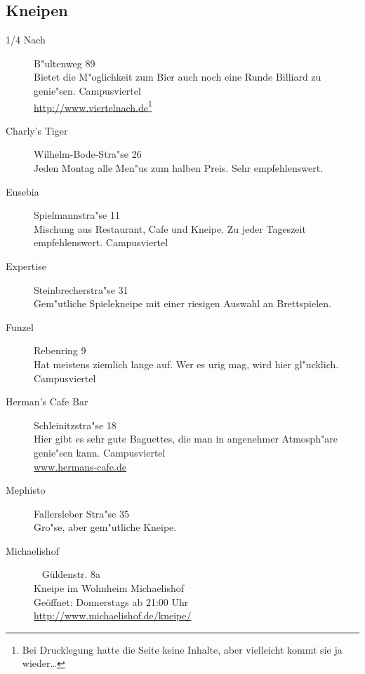 \begin{multicols}{2}
\subsection{Kneipen}
	\begin{description}
		\item[1/4 Nach] \hfill B"ultenweg 89\\
		Bietet die M"oglichkeit zum Bier auch noch eine Runde Billiard zu genie"sen.
		Campusviertel\\
		\url{http://www.viertelnach.de}\footnote{Bei Drucklegung hatte die Seite keine Inhalte, aber vielleicht kommt sie ja wieder\ldots}

		\item[Charly's Tiger] \hfill Wilhelm-Bode-Stra"se 26\\
		Jeden Montag alle Men"us zum halben Preis. Sehr empfehlenswert.


		\item[Eusebia] \hfill Spielmannstra"se 11\\
		Mischung aus Restaurant, Cafe und Kneipe. Zu jeder Tageszeit empfehlenswert.
		Campusviertel

		\item[Expertise] \hfill Steinbrecherstra"se 31\\
		Gem"utliche Spielekneipe mit einer riesigen Auswahl an Brettspielen.

		\item[Funzel] \hfill Rebenring 9\\
		Hat meistens ziemlich lange auf. Wer es urig mag, wird hier gl"ucklich. \\
		Campusviertel

		\item[Herman's Cafe Bar] \hfill Schleinitzstra"se 18\\
		Hier gibt es sehr gute Baguettes, die man in angenehmer Atmosph"are genie"sen kann.
		Campusviertel\\
		\url{www.hermans-cafe.de}

		\item[Mephisto] \hfill Fallersleber Stra"se 35\\
		Gro"se, aber gem"utliche Kneipe.

		\item[Michaelishof]~ \hfill Güldenstr. 8a\\
		Kneipe im Wohnheim Michaelishof\\
		Geöffnet: Donnerstags ab 21:00 Uhr\\
		\url{http://www.michaelishof.de/kneipe/}


\end{description}
\end{multicols}
